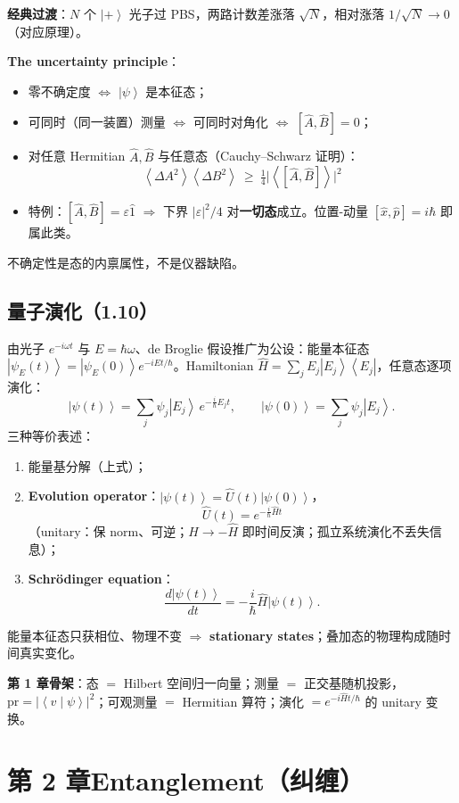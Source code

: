 \documentclass[11pt]{ctexart}
\newcommand{\ket}[1]{\left|#1\right\rangle}
\newcommand{\bra}[1]{\left\langle#1\right|}
\newcommand{\braket}[2]{\left\langle#1\middle|#2\right\rangle}
\newcommand{\ev}[1]{\left\langle#1\right\rangle}
\newcommand{\op}[1]{\hat{#1}}
\begin{document}
\textbf{经典过渡}：$N$ 个 $\ket+$ 光子过 PBS，两路计数差涨落 $\sqrt N$，相对涨落 $1/\sqrt N\to0$（对应原理）。

\textbf{The uncertainty principle}：
\begin{itemize}
\item 零不确定度 $\Leftrightarrow$ $\ket\psi$ 是本征态；
\item 可同时（同一装置）测量 $\Leftrightarrow$ 可同时对角化 $\Leftrightarrow$ $[\op A,\op B]=0$；
\item 对任意 Hermitian $\op A,\op B$ 与任意态（Cauchy--Schwarz 证明）：
\[
\boxed{\;\ev{\Delta A^2}\ev{\Delta B^2}\ \ge\ \tfrac14\big|\ev{[\op A,\op B]}\big|^2\;}
\]
\item 特例：$[\op A,\op B]=\varepsilon\op 1$ $\Rightarrow$ 下界 $|\varepsilon|^2/4$ 对\textbf{一切态}成立。位置-动量 $[\op x,\op p]=i\hbar$ 即属此类。
\end{itemize}
不确定性是态的内禀属性，不是仪器缺陷。

\subsection{量子演化（1.10）}

由光子 $e^{-i\omega t}$ 与 $E=\hbar\omega$、de Broglie 假设推广为公设：能量本征态 $\ket{\psi_E(t)}=\ket{\psi_E(0)}e^{-iEt/\hbar}$。Hamiltonian $\op H=\sum_jE_j\ket{E_j}\bra{E_j}$，任意态逐项演化：
\[
\ket{\psi(t)}=\sum_j\psi_j\ket{E_j}\,e^{-\frac{i}{\hbar}E_jt},\qquad \ket{\psi(0)}=\sum_j\psi_j\ket{E_j}.
\]
三种等价表述：
\begin{enumerate}
\item 能量基分解（上式）；
\item \textbf{Evolution operator}：$\ket{\psi(t)}=\op U(t)\ket{\psi(0)}$，
\[
\op U(t)=e^{-\frac{i}{\hbar}\op Ht}
\]
（unitary：保 norm、可逆；$\op H\to-\op H$ 即时间反演；孤立系统演化不丢失信息）；
\item \textbf{Schrödinger equation}：
\[
\frac{d\ket{\psi(t)}}{dt}=-\frac{i}{\hbar}\op H\ket{\psi(t)}.
\]
\end{enumerate}
能量本征态只获相位、物理不变 $\Rightarrow$ \textbf{stationary states}；叠加态的物理构成随时间真实变化。

\textbf{第 1 章骨架}：态 $=$ Hilbert 空间归一向量；测量 $=$ 正交基随机投影，$\mathrm{pr}=|\braket v\psi|^2$；可观测量 $=$ Hermitian 算符；演化 $=e^{-i\op Ht/\hbar}$ 的 unitary 变换。

\section{第 2 章\quad Entanglement（纠缠）}
\end{document}
